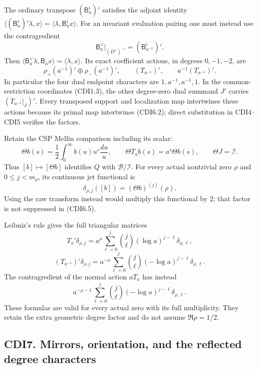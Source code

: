 The ordinary transpose \((\mathsf B_a^i)'\) satisfies the adjoint
identity
\(\langle(\mathsf B_a^i)'\lambda,x\rangle=\langle\lambda,\mathsf B_a^ix\rangle\).
For an invariant evaluation pairing one must instead use the
contragredient \[
\mathsf B_a^\vee|_{(D^\vee)^{-i}}=(\mathsf B_{a^{-1}}^i)'.
\tag{CDI6.3}
\] Then
\(\langle\mathsf B_a^\vee\lambda,\mathsf B_ax\rangle=\langle\lambda,x\rangle\).
Its exact coefficient actions, in degrees \(0,-1,-2\), are \[
\rho_+(a^{-1})'\oplus\rho_-(a^{-1})',\qquad
(T_{a^{-1}})',\qquad a^{-1}(T_{a^{-1}})'.
\tag{CDI6.4}
\] In particular the four dual endpoint characters are
\(1,a^{-1},a^{-1},1\). In the common-restriction coordinates (CDI1.3),
the other degree-zero dual summand \(J'\) carries \((T_{a^{-1}}|_J)'\).
Every transposed support and localization map intertwines these actions
because its primal map intertwines (CDI6.2); direct substitution in
CDI4--CDI5 verifies the factors.

Retain the CSP Mellin comparison including its scalar: \[
\Theta b(s)=\frac12\int_0^\infty b(u)u^s\frac{du}{u},\qquad
\Theta T_ab(s)=a^s\Theta b(s),\qquad \Theta J=\mathcal I.
\tag{CDI6.5}
\] Thus \([b]\mapsto[\Theta b]\) identifies \(Q\) with
\(\mathcal B/\mathcal I\). For every actual nontrivial zero \(\rho\) and
\(0\le j<m_\rho\), its continuous jet functional is \[
\delta_{\rho,j}([b])=(\Theta b)^{(j)}(\rho).
\tag{CDI6.6}
\] Using the raw transform instead would multiply this functional by 2;
that factor is not suppressed in (CDI6.5).

Leibniz's rule gives the full triangular matrices \[
T_a'\delta_{\rho,j}
=a^\rho\sum_{\ell=0}^j\binom j\ell(\log a)^{j-\ell}\delta_{\rho,\ell},
\] \[
(T_{a^{-1}})'\delta_{\rho,j}
=a^{-\rho}\sum_{\ell=0}^j\binom j\ell(-\log a)^{j-\ell}\delta_{\rho,\ell}.
\tag{CDI6.7}
\] The contragredient of the normal action \(aT_a\) has instead \[
a^{-\rho-1}\sum_{\ell=0}^j\binom j\ell(-\log a)^{j-\ell}\delta_{\rho,\ell}.
\tag{CDI6.8}
\] These formulas are valid for every actual zero with its full
multiplicity. They retain the extra geometric degree factor and do not
assume \(\Re\rho=1/2\).

\subsection{CDI7. Mirrors, orientation, and the reflected degree
characters}\label{cdi7.-mirrors-orientation-and-the-reflected-degree-characters}

